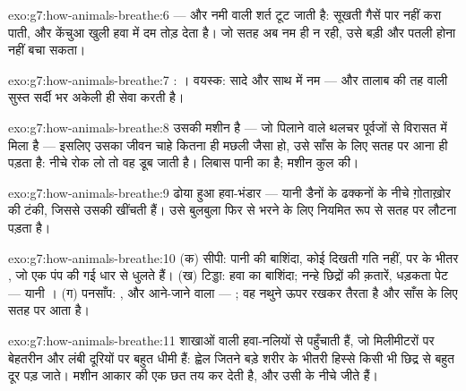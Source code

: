 \begin{solution}{exo:g7:how-animals-breathe:6}
 --- और नमी वाली शर्त टूट जाती है: सूखती  गैसें पार
नहीं करा पाती, और केंचुआ खुली हवा में दम तोड़ देता है। जो सतह अब नम ही
न रही, उसे बड़ी और पतली होना नहीं बचा सकता।
\end{solution}

\begin{solution}{exo:g7:how-animals-breathe:7}
: । वयस्क: सादे  और साथ में नम  --- और तालाब की तह
वाली सुस्त सर्दी भर अकेली  ही सेवा करती है।
\end{solution}

\begin{solution}{exo:g7:how-animals-breathe:8}
उसकी मशीन  है --- जो  पिलाने वाले थलचर पूर्वजों से विरासत में
मिला है --- इसलिए उसका जीवन चाहे कितना ही मछली जैसा हो, उसे साँस के लिए
सतह पर आना ही पड़ता है: नीचे रोक लो तो वह डूब जाती है। लिबास पानी का
है; मशीन कुल की।
\end{solution}

\begin{solution}{exo:g7:how-animals-breathe:9}
ढोया हुआ हवा-भंडार --- यानी डैनों के ढक्कनों के नीचे ग़ोताख़ोर की टंकी,
जिससे उसकी  खींचती हैं। उसे बुलबुला फिर से भरने के लिए
नियमित रूप से सतह पर लौटना पड़ता है।
\end{solution}

\begin{solution}{exo:g7:how-animals-breathe:10}
(क) सीपी: पानी की बाशिंदा, कोई दिखती गति नहीं, पर  के भीतर , जो
एक पंप की गई धार से धुलते हैं। (ख) टिड्डा: हवा का बाशिंदा; नन्हे छिद्रों
की क़तारें, धड़कता पेट --- यानी । (ग) पनसाँप: , और
आने-जाने वाला --- ; वह नथुने ऊपर रखकर तैरता है और साँस के लिए सतह
पर आता है।
\end{solution}

\begin{solution}{exo:g7:how-animals-breathe:11}
 शाखाओं वाली हवा-नलियों से पहुँचाती हैं, जो मिलीमीटरों पर
बेहतरीन और लंबी दूरियों पर बहुत धीमी हैं: ह्वेल जितने बड़े शरीर के भीतरी
हिस्से किसी भी छिद्र से बहुत दूर पड़ जाते। मशीन आकार की एक छत तय कर देती
है, और  उसी के नीचे जीते हैं।
\end{solution}

